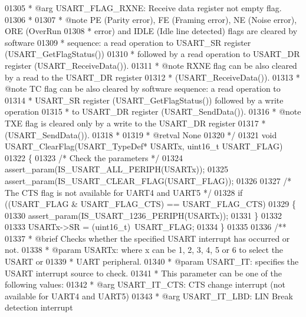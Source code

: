\begin{DoxyCode}
01305 \textcolor{comment}{  *            @arg USART\_FLAG\_RXNE: Receive data register not empty flag.}
01306 \textcolor{comment}{  *   }
01307 \textcolor{comment}{  * @note   PE (Parity error), FE (Framing error), NE (Noise error), ORE (OverRun }
01308 \textcolor{comment}{  *          error) and IDLE (Idle line detected) flags are cleared by software }
01309 \textcolor{comment}{  *          sequence: a read operation to USART\_SR register (USART\_GetFlagStatus()) }
01310 \textcolor{comment}{  *          followed by a read operation to USART\_DR register (USART\_ReceiveData()).}
01311 \textcolor{comment}{  * @note   RXNE flag can be also cleared by a read to the USART\_DR register }
01312 \textcolor{comment}{  *          (USART\_ReceiveData()).}
01313 \textcolor{comment}{  * @note   TC flag can be also cleared by software sequence: a read operation to }
01314 \textcolor{comment}{  *          USART\_SR register (USART\_GetFlagStatus()) followed by a write operation}
01315 \textcolor{comment}{  *          to USART\_DR register (USART\_SendData()).}
01316 \textcolor{comment}{  * @note   TXE flag is cleared only by a write to the USART\_DR register }
01317 \textcolor{comment}{  *          (USART\_SendData()).}
01318 \textcolor{comment}{  *   }
01319 \textcolor{comment}{  * @retval None}
01320 \textcolor{comment}{  */}
01321 \textcolor{keywordtype}{void} USART_ClearFlag(USART\_TypeDef* USARTx, uint16\_t USART\_FLAG)
01322 \{
01323   \textcolor{comment}{/* Check the parameters */}
01324   assert_param(IS\_USART\_ALL\_PERIPH(USARTx));
01325   assert_param(IS\_USART\_CLEAR\_FLAG(USART\_FLAG));
01326 
01327   \textcolor{comment}{/* The CTS flag is not available for UART4 and UART5 */}
01328   \textcolor{keywordflow}{if} ((USART\_FLAG & USART_FLAG_CTS) == USART_FLAG_CTS)
01329   \{
01330     assert_param(IS\_USART\_1236\_PERIPH(USARTx));
01331   \}
01332 
01333   USARTx->SR = (uint16\_t)~USART\_FLAG;
01334 \}
01335 
01336 \textcolor{comment}{/**}
01337 \textcolor{comment}{  * @brief  Checks whether the specified USART interrupt has occurred or not.}
01338 \textcolor{comment}{  * @param  USARTx: where x can be 1, 2, 3, 4, 5 or 6 to select the USART or }
01339 \textcolor{comment}{  *         UART peripheral.}
01340 \textcolor{comment}{  * @param  USART\_IT: specifies the USART interrupt source to check.}
01341 \textcolor{comment}{  *          This parameter can be one of the following values:}
01342 \textcolor{comment}{  *            @arg USART\_IT\_CTS:  CTS change interrupt (not available for UART4 and UART5)}
01343 \textcolor{comment}{  *            @arg USART\_IT\_LBD:  LIN Break detection interrupt}

\end{DoxyCode}
